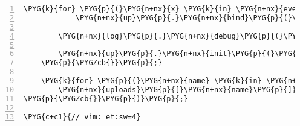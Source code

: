 \begin{Verbatim}[commandchars=\\\{\},numbers=left,firstnumber=1,stepnumber=5]
        \PYG{k}{for} \PYG{p}{(}\PYG{n+nx}{x} \PYG{k}{in} \PYG{n+nx}{events}\PYG{p}{)}
            \PYG{n+nx}{up}\PYG{p}{.}\PYG{n+nx}{bind}\PYG{p}{(}\PYG{n+nx}{x}\PYG{p}{,} \PYG{n+nx}{events}\PYG{p}{[}\PYG{n+nx}{x}\PYG{p}{]}\PYG{p}{)}\PYG{p}{;}

        \PYG{n+nx}{log}\PYG{p}{.}\PYG{n+nx}{debug}\PYG{p}{(}\PYG{l+s+s2}{"debug"}\PYG{p}{)}\PYG{p}{;}

        \PYG{n+nx}{up}\PYG{p}{.}\PYG{n+nx}{init}\PYG{p}{(}\PYG{p}{)}\PYG{p}{;}
    \PYG{p}{\PYGZcb{}}\PYG{p}{;}

    \PYG{k}{for} \PYG{p}{(}\PYG{n+nx}{name} \PYG{k}{in} \PYG{n+nx}{uploads}\PYG{p}{)}
        \PYG{n+nx}{uploads}\PYG{p}{[}\PYG{n+nx}{name}\PYG{p}{]} \PYG{o}{=} \PYG{k}{new} \PYG{n+nx}{context}\PYG{p}{(}\PYG{n+nx}{name}\PYG{p}{)}\PYG{p}{;}
\PYG{p}{\PYGZcb{}}\PYG{p}{)}\PYG{p}{;}

\PYG{c+c1}{// vim: et:sw=4}
\end{Verbatim}


